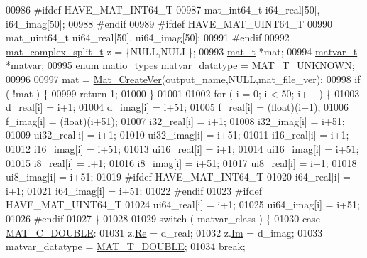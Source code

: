 \begin{DoxyCode}
{{{00986 \textcolor{preprocessor}{#ifdef HAVE\_MAT\_INT64\_T}
00987     mat\_int64\_t i64\_real[50], i64\_imag[50];
00988 \textcolor{preprocessor}{#endif}
00989 \textcolor{preprocessor}{#ifdef HAVE\_MAT\_UINT64\_T}
00990     mat\_uint64\_t ui64\_real[50], ui64\_imag[50];
00991 \textcolor{preprocessor}{#endif}
00992     \hyperlink{group___m_a_t_structmat__complex__split__t}{mat\_complex\_split\_t} z = \{NULL,NULL\};
00993     \hyperlink{struct__mat__t}{mat\_t} *mat;
00994     \hyperlink{group___m_a_t_structmatvar__t}{matvar\_t} *matvar;
00995     \textcolor{keyword}{enum} \hyperlink{group___m_a_t_gacf7b3b879282b7ab3a51190e49bf3453}{matio\_types} matvar\_datatype = \hyperlink{group___m_a_t_ggacf7b3b879282b7ab3a51190e49bf3453a2a7318fe8bf9464935e7ed8902618293}{MAT\_T\_UNKNOWN};
00996 
00997     mat = \hyperlink{group___m_a_t_ga22d404f203af7869c841400e7ad247cf}{Mat\_CreateVer}(output\_name,NULL,mat\_file\_ver);
00998     \textcolor{keywordflow}{if} ( !mat ) \{
00999         \textcolor{keywordflow}{return} 1;
01000     \}
01001 
01002     \textcolor{keywordflow}{for} ( i = 0; i < 50; i++ ) \{
01003           d\_real[i] = i+1;
01004           d\_imag[i] = i+51;
01005           f\_real[i] = (float)(i+1);
01006           f\_imag[i] = (float)(i+51);
01007         i32\_real[i] = i+1;
01008         i32\_imag[i] = i+51;
01009        ui32\_real[i] = i+1;
01010        ui32\_imag[i] = i+51;
01011         i16\_real[i] = i+1;
01012         i16\_imag[i] = i+51;
01013        ui16\_real[i] = i+1;
01014        ui16\_imag[i] = i+51;
01015          i8\_real[i] = i+1;
01016          i8\_imag[i] = i+51;
01017         ui8\_real[i] = i+1;
01018         ui8\_imag[i] = i+51;
01019 \textcolor{preprocessor}{#ifdef HAVE\_MAT\_INT64\_T}
01020         i64\_real[i] = i+1;
01021         i64\_imag[i] = i+51;
01022 \textcolor{preprocessor}{#endif}
01023 \textcolor{preprocessor}{#ifdef HAVE\_MAT\_UINT64\_T}
01024        ui64\_real[i] = i+1;
01025        ui64\_imag[i] = i+51;
01026 \textcolor{preprocessor}{#endif}
01027     \}
01028 
01029     \textcolor{keywordflow}{switch} ( matvar\_class ) \{
01030         \textcolor{keywordflow}{case} \hyperlink{group___m_a_t_ggad4d60ae7b709fc81bfd744fb4c857c40a5d70e0862e5bdb7bd86bf7ba5948f307}{MAT\_C\_DOUBLE}:
01031             z.\hyperlink{group___m_a_t_a484a93607508adac2bce53a0252e0325}{Re} = d\_real;
01032             z.\hyperlink{group___m_a_t_a7182d10b0d3598415887376065440946}{Im} = d\_imag;
01033             matvar\_datatype = \hyperlink{group___m_a_t_ggacf7b3b879282b7ab3a51190e49bf3453a31e721ecf7e188196f83c32838288797}{MAT\_T\_DOUBLE};
01034             \textcolor{keywordflow}{break};
}}}
\end{DoxyCode}
